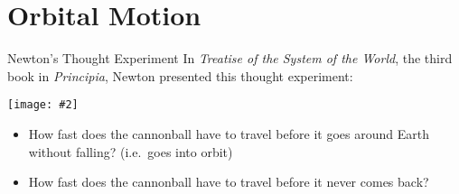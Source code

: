 \documentclass[12pt,compress,aspectratio=169]{beamer}
\newcommand{\pic}[2]{\texttt{[image: \#2]}}
\newcommand{\mb}[1]{\ensuremath\mathbf{#1}}
\newcommand{\eq}[2]{\vspace{#1}{\Large\begin{displaymath}#2\end{displaymath}}}
\begin{document}
%
%



\section{Orbital Motion}


\begin{frame}{Newton's Thought Experiment}
  In \emph{Treatise of the System of the World}, the third book in
  \emph{Principia}, Newton presented this thought experiment:
  \begin{center}
    \pic{.8}{figure-5}
  \end{center}
  \begin{itemize}
  \item How fast does the cannonball have to travel before it goes around Earth
    without falling? (i.e.\ goes into orbit)
  \item How fast does the cannonball have to travel before it never comes back?
  \end{itemize}
\end{frame}
\end{document}
